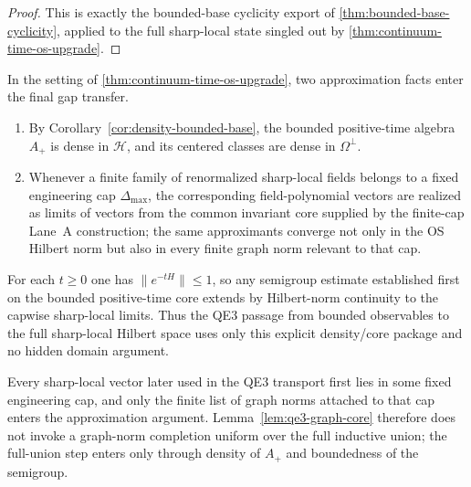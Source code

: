 \begin{proof}
This is exactly the bounded-base cyclicity export of \cref{thm:bounded-base-cyclicity}, applied to the full sharp-local state singled out by \cref{thm:continuum-time-os-upgrade}.
\end{proof}

\begin{lemma}\label{lem:qe3-graph-core}
In the setting of \cref{thm:continuum-time-os-upgrade}, two approximation facts enter the final gap transfer.
\begin{enumerate}[label=\textup{(\roman*)},leftmargin=2.25em]
\item By Corollary~\ref{cor:density-bounded-base}, the bounded positive-time algebra $A_+$ is dense in $\mathcal H$, and its centered classes are dense in $\Omega^{\perp}$.
\item Whenever a finite family of renormalized sharp-local fields belongs to a fixed engineering cap $\Delta_{\max}$, the corresponding field-polynomial vectors are realized as limits of vectors from the common invariant core supplied by the finite-cap Lane~A construction; the same approximants converge not only in the OS Hilbert norm but also in every finite graph norm relevant to that cap.
\end{enumerate}
For each $t\ge 0$ one has $\|e^{-tH}\|\le 1$, so any semigroup estimate established first on the bounded positive-time core extends by Hilbert-norm continuity to the capwise sharp-local limits. Thus the QE3 passage from bounded observables to the full sharp-local Hilbert space uses only this explicit density/core package and no hidden domain argument.
\end{lemma}

\begin{remark}
Every sharp-local vector later used in the QE3 transport first lies in some fixed engineering cap, and only the finite list of graph norms attached to that cap enters the approximation argument. Lemma~\ref{lem:qe3-graph-core} therefore does not invoke a graph-norm completion uniform over the full inductive union; the full-union step enters only through density of $A_+$ and boundedness of the semigroup.
\end{remark}


